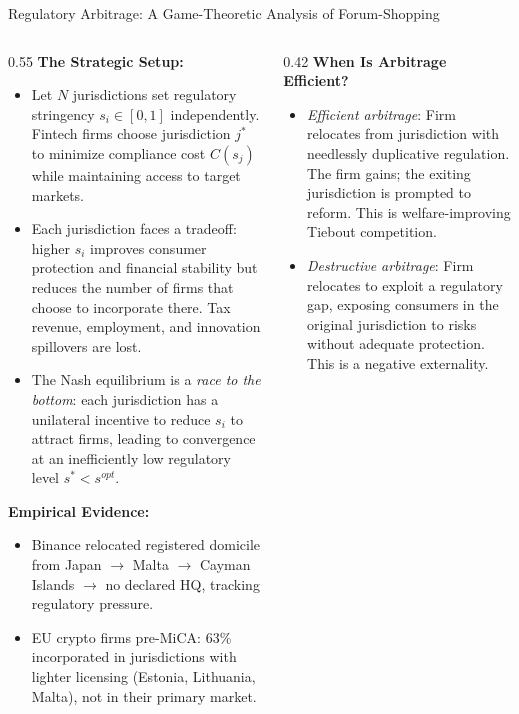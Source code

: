 
\begin{frame}{Regulatory Arbitrage: A Game-Theoretic Analysis of Forum-Shopping}
  \begin{columns}[T]
    \begin{column}{0.55\textwidth}
      \textbf{The Strategic Setup:}
      \begin{itemize}
        \item Let $N$ jurisdictions set regulatory stringency $s_i \in [0, 1]$ independently. Fintech firms choose jurisdiction $j^*$ to minimize compliance cost $C(s_j)$ while maintaining access to target markets.
        \item Each jurisdiction faces a tradeoff: higher $s_i$ improves consumer protection and financial stability but reduces the number of firms that choose to incorporate there. Tax revenue, employment, and innovation spillovers are lost.
        \item The Nash equilibrium is a \emph{race to the bottom}: each jurisdiction has a unilateral incentive to reduce $s_i$ to attract firms, leading to convergence at an inefficiently low regulatory level $s^* < s^{opt}$.
      \end{itemize}
      \vspace{0.3em}
      \textbf{Empirical Evidence:}
      \begin{itemize}
        \item Binance relocated registered domicile from Japan $\to$ Malta $\to$ Cayman Islands $\to$ no declared HQ, tracking regulatory pressure.
        \item EU crypto firms pre-MiCA: 63\% incorporated in jurisdictions with lighter licensing (Estonia, Lithuania, Malta), not in their primary market.
      \end{itemize}
    \end{column}
    \begin{column}{0.42\textwidth}
      \textbf{When Is Arbitrage Efficient?}
      \begin{itemize}
        \item \textit{Efficient arbitrage}: Firm relocates from jurisdiction with needlessly duplicative regulation. The firm gains; the exiting jurisdiction is prompted to reform. This is welfare-improving Tiebout competition.
        \item \textit{Destructive arbitrage}: Firm relocates to exploit a regulatory gap, exposing consumers in the original jurisdiction to risks without adequate protection. This is a negative externality.

\end{itemize}
\end{column}
\end{columns}
\end{frame}
